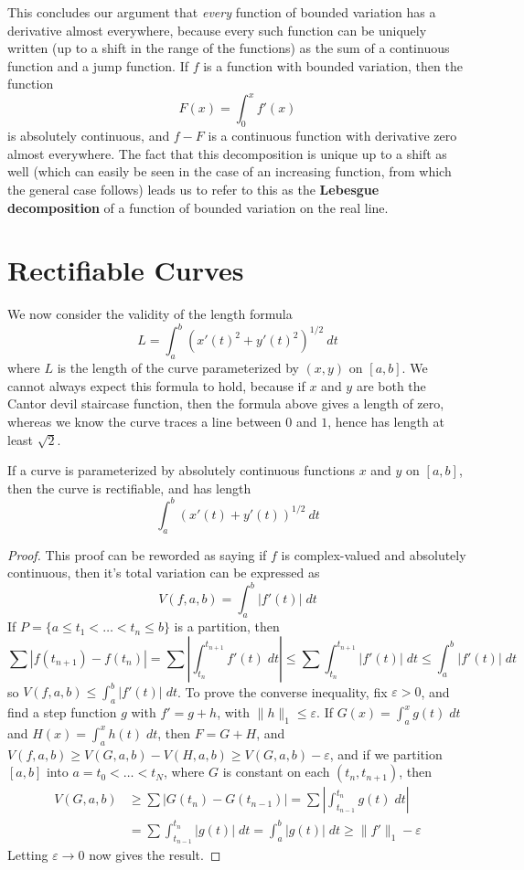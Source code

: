 This concludes our argument that {\it every} function of bounded variation has a derivative almost everywhere, because every such function can be uniquely written (up to a shift in the range of the functions) as the sum of a continuous function and a jump function. If $f$ is a function with bounded variation, then the function
%
\[ F(x) = \int_0^x f'(x) \]
%
is absolutely continuous, and $f - F$ is a continuous function with derivative zero almost everywhere. The fact that this decomposition is unique up to a shift as well (which can easily be seen in the case of an increasing function, from which the general case follows) leads us to refer to this as the {\bf Lebesgue decomposition} of a function of bounded variation on the real line.

\section{Rectifiable Curves}

We now consider the validity of the length formula
%
\[ L = \int_a^b (x'(t)^2 + y'(t)^2)^{1/2}\ dt \]
%
where $L$ is the length of the curve parameterized by $(x,y)$ on $[a,b]$. We cannot always expect this formula to hold, because if $x$ and $y$ are both the Cantor devil staircase function, then the formula above gives a length of zero, whereas we know the curve traces a line between $0$ and $1$, hence has length at least $\sqrt{2}$.

\begin{theorem}
    If a curve is parameterized by absolutely continuous functions $x$ and $y$ on $[a,b]$, then the curve is rectifiable, and has length
    \[ \int_a^b (x'(t) + y'(t))^{1/2}\ dt \]
\end{theorem}
\begin{proof}
  This proof can be reworded as saying if $f$ is complex-valued and absolutely continuous, then it's total variation can be expressed as
  \[ V(f,a,b) = \int_a^b |f'(t)|\; dt \]
  If $P = \{ a \leq t_1 < \dots < t_n \leq b \}$ is a partition, then
  \[ \sum |f(t_{n+1}) - f(t_n)| = \sum \left| \int_{t_n}^{t_{n+1}} f'(t)\; dt \right| \leq \sum \int_{t_n}^{t_{n+1}} |f'(t)|\; dt \leq \int_a^b |f'(t)|\; dt \]
  so $V(f,a,b) \leq \int_a^b |f'(t)|\; dt$. To prove the converse inequality, fix $\varepsilon > 0$, and find a step function $g$ with $f' = g + h$, with $\| h \|_1 \leq \varepsilon$. If $G(x) = \int_a^x g(t)\; dt$ and $H(x) = \int_a^x h(t)\; dt$, then $F = G + H$, and $V(f,a,b) \geq V(G,a,b) - V(H,a,b) \geq V(G,a,b) - \varepsilon$, and if we partition $[a,b]$ into $a = t_0 < \dots < t_N$, where $G$ is constant on each $(t_n, t_{n+1})$, then 
  \begin{align*}
    V(G,a,b) &\geq \sum |G(t_n) - G(t_{n-1})| = \sum \left| \int_{t_{n-1}}^{t_n} g(t)\; dt \right|\\
    &= \sum \int_{t_{n-1}}^{t_n} |g(t)|\; dt = \int_a^b |g(t)|\; dt \geq \| f' \|_1 - \varepsilon
  \end{align*}
  Letting $\varepsilon \to 0$ now gives the result.
\end{proof}

